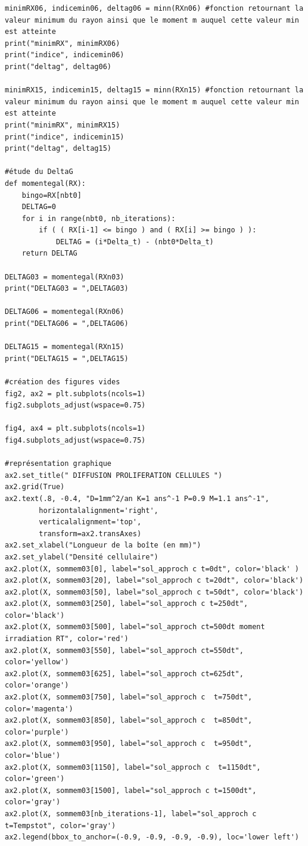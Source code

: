 \documentclass[12pt,a4paper]{article}
\begin{document}
\begin{lstlisting}[style=stylepython]
minimRX06, indicemin06, deltag06 = minn(RXn06) #fonction retournant la valeur minimum du rayon ainsi que le moment m auquel cette valeur min est atteinte
print("minimRX", minimRX06)
print("indice", indicemin06)
print("deltag", deltag06)

minimRX15, indicemin15, deltag15 = minn(RXn15) #fonction retournant la valeur minimum du rayon ainsi que le moment m auquel cette valeur min est atteinte
print("minimRX", minimRX15)
print("indice", indicemin15)
print("deltag", deltag15)

#étude du DeltaG
def momentegal(RX):
    bingo=RX[nbt0]
    DELTAG=0
    for i in range(nbt0, nb_iterations):
        if ( ( RX[i-1] <= bingo ) and ( RX[i] >= bingo ) ):
            DELTAG = (i*Delta_t) - (nbt0*Delta_t) 
    return DELTAG

DELTAG03 = momentegal(RXn03)
print("DELTAG03 = ",DELTAG03)

DELTAG06 = momentegal(RXn06)
print("DELTAG06 = ",DELTAG06)

DELTAG15 = momentegal(RXn15)
print("DELTAG15 = ",DELTAG15)

#création des figures vides 
fig2, ax2 = plt.subplots(ncols=1)
fig2.subplots_adjust(wspace=0.75)  

fig4, ax4 = plt.subplots(ncols=1)
fig4.subplots_adjust(wspace=0.75)

#représentation graphique 
ax2.set_title(" DIFFUSION PROLIFERATION CELLULES ")
ax2.grid(True)
ax2.text(.8, -0.4, "D=1mm^2/an K=1 ans^-1 P=0.9 M=1.1 ans^-1",
        horizontalalignment='right',
        verticalalignment='top',
        transform=ax2.transAxes)
ax2.set_xlabel("Longueur de la boîte (en mm)")
ax2.set_ylabel("Densité cellulaire")
ax2.plot(X, sommem03[0], label="sol_approch c t=0dt", color='black' )
ax2.plot(X, sommem03[20], label="sol_approch c t=20dt", color='black')
ax2.plot(X, sommem03[50], label="sol_approch c t=50dt", color='black')
ax2.plot(X, sommem03[250], label="sol_approch c t=250dt", color='black')
ax2.plot(X, sommem03[500], label="sol_approch ct=500dt moment irradiation RT", color='red')
ax2.plot(X, sommem03[550], label="sol_approch ct=550dt", color='yellow')
ax2.plot(X, sommem03[625], label="sol_approch ct=625dt", color='orange')
ax2.plot(X, sommem03[750], label="sol_approch c  t=750dt", color='magenta')
ax2.plot(X, sommem03[850], label="sol_approch c  t=850dt", color='purple')
ax2.plot(X, sommem03[950], label="sol_approch c  t=950dt", color='blue')
ax2.plot(X, sommem03[1150], label="sol_approch c  t=1150dt", color='green')
ax2.plot(X, sommem03[1500], label="sol_approch c t=1500dt", color='gray')
ax2.plot(X, sommem03[nb_iterations-1], label="sol_approch c t=Tempstot", color='gray')
ax2.legend(bbox_to_anchor=(-0.9, -0.9, -0.9, -0.9), loc='lower left')



\end{lstlisting}
\end{document}
